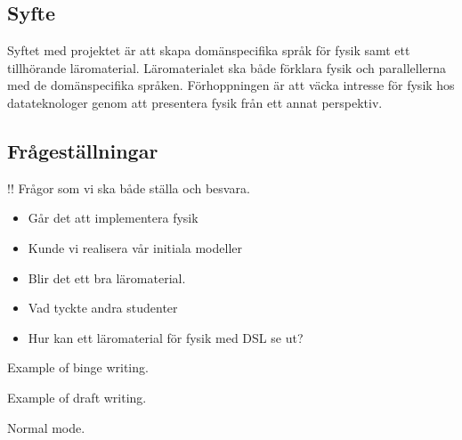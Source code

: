 \begin{binge}
\chapter{Syfte}

Syftet med projektet är att skapa domänspecifika språk för fysik samt ett
tillhörande läromaterial. Läromaterialet ska både förklara fysik och
parallellerna med de domänspecifika språken. Förhoppningen är att väcka intresse
för fysik hos datateknologer genom att presentera fysik från ett annat
perspektiv. 

\section{Frågeställningar}
!! Frågor som vi ska både ställa och besvara.
\begin{itemize}
  \item Går det att implementera fysik
  \item Kunde vi realisera vår initiala modeller
  \item Blir det ett bra läromaterial.
  \item Vad tyckte andra studenter
  \item Hur kan ett läromaterial för fysik med DSL se ut?
\end{itemize}

  Example of binge writing.
\end{binge}

\begin{draft}
  Example of draft writing.
\end{draft}
Normal mode.
